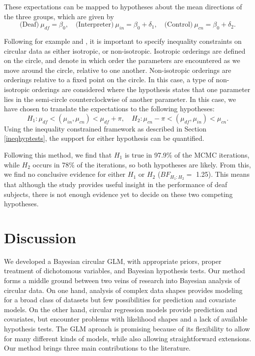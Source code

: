 \documentclass[11pt,a4paper]{article}\usepackage[]{graphicx}\usepackage[]{color}
\begin{document}
These expectations can be mapped to hypotheses about the mean directions of the three groups, which are given by \[  \text{(Deaf)} ~ \mu_{df} = \beta_0, \quad \text{(Interpreter)} ~ \mu_{in} =  \beta_0 + \delta_1, \quad \text{(Control)} ~ \mu_{cn} = \beta_0 + \delta_2.\]

Following for example \citet{rueda2009estimation} and \citet{baayen2014evaluating}, it is important to specify inequality constraints on circular data as either isotropic, or non-isotropic. Isotropic orderings are defined on the circle, and denote in which order the parameters are encountered as we move around the circle, relative to one another. Non-isotropic orderings are orderings relative to a fixed point on the circle. In this case, a type of non-isotropic orderings are considered where the hypothesis states that one parameter lies in the semi-circle counterclockwise of another parameter. In this case, we have chosen to translate the expectations to the following hypotheses:
\begin{equation}
H_1 : \mu_{df} < (\mu_{in}, \mu_{cn}) < \mu_{df} + \pi, \quad H_2 :  \mu_{cn} - \pi < (\mu_{df}, \mu_{in}) < \mu_{cn}.
\end{equation}
Using the inequality constrained framework as described in Section \ref{ineqhyptests}, the support for either hypothesis can be quantified.



Following this method, we find that \( H_1 \) is true in 97.9\% of the MCMC iterations, while \( H_2 \)  occurs in 78\% of the iterations, so both hypotheses are likely. From this, we find no conclusive evidence for either \( H_1 \) or \( H_2 \) (\( BF_{H_1:H_2} =\) 1.25). This means that although the study provides useful insight in the performance of deaf subjects, there is not enough evidence yet to decide on these two competing hypotheses.


\section{Discussion}

\label{discussion}


We developed a Bayesian circular GLM, with appropriate priors, proper treatment of dichotomous variables, and Bayesian hypothesis tests. Our method forms a middle ground between two veins of research into Bayesian analysis of circular data. On one hand, analysis of complex data shapes \citep{ghosh2003semiparametric, ferreira2008directional, fernandez2016bayesian} provides modeling for a broad class of datasets but few possibilities for prediction and covariate models. On the other hand, circular regression models \citep{fisher1992regression, gill2010, lagona2016regression} provide prediction and covariates, but encounter problems with likelihood shapes and a lack of available hypothesis tests. The GLM aproach is promising because of its flexibility to allow for many different kinds of models, while also allowing straightforward extensions. Our method brings three main contributions to the literature.
\end{document}
